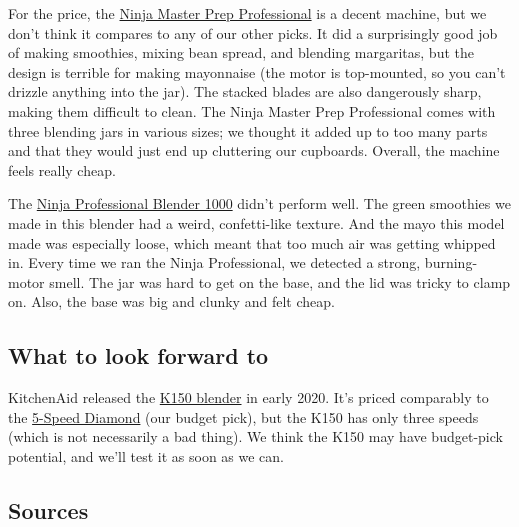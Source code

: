 For the price, the
\href{https://www.nytimes3xbfgragh.onion/wirecutter/out/link/8526/24649/4/57895?merchant=Amazon}{Ninja
Master Prep Professional} is a decent machine, but we don't think it
compares to any of our other picks. It did a surprisingly good job of
making smoothies, mixing bean spread, and blending margaritas, but the
design is terrible for making mayonnaise (the motor is top-mounted, so
you can't drizzle anything into the jar). The stacked blades are also
dangerously sharp, making them difficult to clean. The Ninja Master Prep
Professional comes with three blending jars in various sizes; we thought
it added up to too many parts and that they would just end up cluttering
our cupboards. Overall, the machine feels really cheap.

The
\href{https://www.nytimes3xbfgragh.onion/wirecutter/out/link/8527/24650/4/57896?merchant=Amazon}{Ninja
Professional Blender 1000} didn't perform well. The green smoothies we
made in this blender had a weird, confetti-like texture. And the mayo
this model made was especially loose, which meant that too much air was
getting whipped in. Every time we ran the Ninja Professional, we
detected a strong, burning-motor smell. The jar was hard to get on the
base, and the lid was tricky to clamp on. Also, the base was big and
clunky and felt cheap.

\hypertarget{what-to-look-forward-to}{%
\subsection{What to look forward to}\label{what-to-look-forward-to}}

KitchenAid released the
\href{https://www.nytimes3xbfgragh.onion/wirecutter/out/link/36680/159117/4/109205/?merchant=KitchenAid}{K150
blender} in early 2020. It's priced comparably to the
\protect\hyperlink{budget-pick-kitchenaid-5-speed-diamond-blender}{5-Speed
Diamond} (our budget pick), but the K150 has only three speeds (which is
not necessarily a bad thing). We think the K150 may have budget-pick
potential, and we'll test it as soon as we can.

\hypertarget{sources}{%
\subsection{Sources}\label{sources}}

